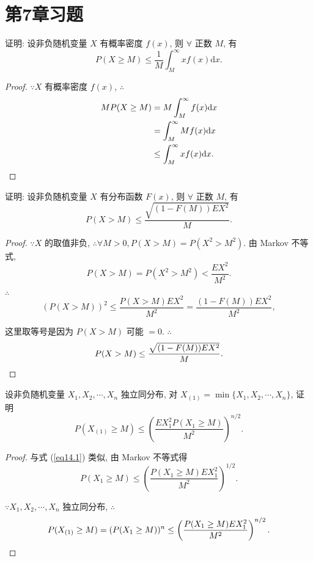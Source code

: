 \documentclass{ctexart}
\begin{document}
\section{第7章习题}
\addtocounter{exsection}{7}
\begin{exercise}%
    证明: 设非负随机变量 $X$ 有概率密度 $f(x)$, 则 $\forall$ 正数 $M$, 有
    \[P(X\geq M)\leq\dfrac{1}{M}\int_M^\infty xf(x)\mathrm{d}x.\]
\end{exercise}
\begin{proof}
    $\because X$ 有概率密度 $f(x)$, $\therefore$
    \begin{align*}
        MP(X\geq M) & =M\int_M^\infty f(x)\mathrm{d}x \\
        & =\int_M^\infty Mf(x)\mathrm{d}x \\
        & \leq\int_M^\infty xf(x)\mathrm{d}x.\qedhere
    \end{align*}
\end{proof}
\begin{exercise}%
    证明: 设非负随机变量 $X$ 有分布函数 $F(x)$, 则 $\forall$ 正数 $M$, 有
    \[P(X>M)\leq\dfrac{\sqrt{(1-F(M))EX^2}}{M}.\]
\end{exercise}
\begin{proof}
    $\because X$ 的取值非负, $\therefore\forall M>0,P(X>M)=P(X^2>M^2)$. 由 Markov 不等式,
    \[P(X>M)=P(X^2>M^2)<\dfrac{EX^2}{M^2}.\]

    $\therefore$
    \begin{equation}\label{eq14.1}
        (P(X>M))^2\leq\dfrac{P(X>M)EX^2}{M^2}=\dfrac{(1-F(M))EX^2}{M^2},
    \end{equation}

    这里取等号是因为 $P(X>M)$ 可能 $=0$. $\therefore$
    \[P(X>M)\leq\dfrac{\sqrt{(1-F(M))EX^2}}{M}.\qedhere\]
\end{proof}
\begin{exercise}%
    设非负随机变量 $X_1,X_2,\cdots,X_n$ 独立同分布, 对 $X_{(1)}=\min\{X_1,X_2,\cdots,X_n\}$, 证明
    \[P(X_{(1)}\geq M)\leq\left(\dfrac{EX_1^2P(X_1\geq M)}{M^2}\right)^{n/2}.\]
\end{exercise}
\begin{proof}
    与式 (\ref{eq14.1}) 类似, 由 Markov 不等式得
    \[P(X_1\geq M)\leq\left(\dfrac{P(X_1\geq M)EX_1^2}{M^2}\right)^{1/2}.\]

    $\because X_1,X_2,\cdots,X_n$ 独立同分布, $\therefore$
    \[P(X_{(1)}\geq M)=(P(X_1\geq M))^n\leq\left(\dfrac{P(X_1\geq M)EX_1^2}{M^2}\right)^{n/2}.\qedhere\]
\end{proof}
\end{document}
